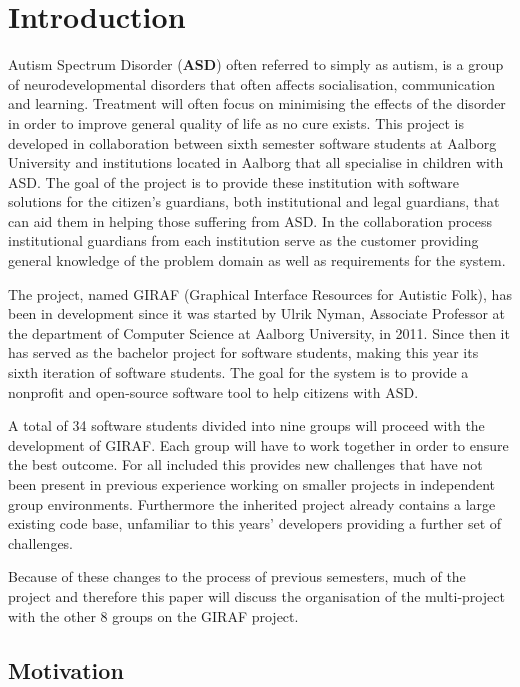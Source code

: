 \chapter{Introduction}
Autism Spectrum Disorder (\textbf{ASD}) often referred to simply as autism, is a 
group of neurodevelopmental disorders that often affects socialisation, communication and learning.
Treatment will often focus on minimising the effects of the disorder in order to improve general quality of life as no cure exists.
This project is developed in collaboration between sixth semester software students at Aalborg University and institutions located in Aalborg that all specialise in children with ASD.
The goal of the project is to provide these institution with software solutions for the citizen's guardians, both institutional and legal guardians, that can aid them in helping those suffering from ASD.
In the collaboration process institutional guardians from each institution serve as the customer providing general knowledge of the problem domain as well as requirements for the system.

The project, named GIRAF (Graphical Interface Resources for Autistic Folk), has been in development since it was started by Ulrik Nyman, Associate Professor at the department of Computer Science at Aalborg University, in 2011. 
Since then it has served as the bachelor project for software students, making this year its sixth iteration of software students.
The goal for the system is to provide a nonprofit and open-source software tool to help citizens with ASD.

A total of 34 software students divided into nine groups will proceed with the development of GIRAF.
Each group will have to work together in order to ensure the best outcome.
For all included this provides new challenges that have not been present in previous experience working on smaller projects in independent group environments.
Furthermore the inherited project already contains a large existing code base, unfamiliar to this years' developers providing a further set of challenges.

Because of these changes to the process of previous semesters, much of the project and therefore this paper will discuss the organisation of the multi-project with the other 8 groups on the GIRAF project.

\section{Motivation}

